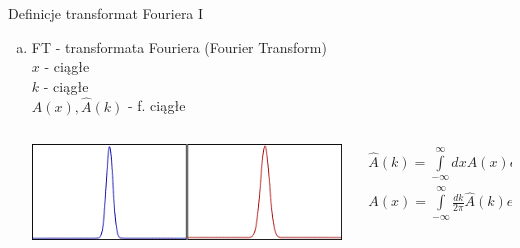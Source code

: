 \begin{frame}{Definicje transformat Fouriera I}
	\begin{enumerate}[a)]
		\item FT - transformata Fouriera (Fourier Transform) \\
		$x$ - ciągłe \\
		$k$ - ciągłe \\
		$A(x), \widehat{A}(k)$ - f. ciągłe
        \begin{columns}
            \begin{column}{0.35\textwidth}
                \includegraphics[width=\textwidth]{img/16/ft_wykres1.png}
            \end{column}
            \begin{column}{0.65\textwidth}
                \begin{block}
                    \centering
                    \renewcommand{\arraystretch}{1.5}
                    \setlength{\abovedisplayskip}{0pt}
                    \setlength{\belowdisplayskip}{0pt}
                    \setlength{\abovedisplayshortskip}{0pt}
                    \setlength{\belowdisplayshortskip}{0pt}
                    \[
                        \begin{array}{c}
                            \widehat{A}(k) = \int\limits_{-\infty}^{\infty}dx A(x) e^{-ikx} \\
                            A(x) = \int\limits_{-\infty}^{\infty} \frac{dk}{2 \pi} \widehat{A}(k) e^{ikx}
                        \end{array}
                        \tag{16.1}
                    \]
                \end{block}
            \end{column}
        \end{columns}
	\end{enumerate}
\end{frame}
